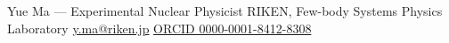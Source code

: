 \documentclass[a4paper,11pt,fontset=none]{ctexart}
\begin{document}
  {Yue Ma --- Experimental Nuclear Physicist}
  {RIKEN, Few-body Systems Physics Laboratory \quad\textbar\quad \href{mailto:y.ma@riken.jp}{y.ma@riken.jp} \quad\textbar\quad \href{https://orcid.org/0000-0001-8412-8308}{ORCID 0000-0001-8412-8308}}


\end{document}
